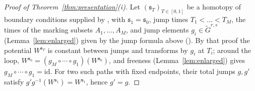\documentclass[11pt]{amsart}
\theoremstyle{definition}
\theoremstyle{remark}
\begin{document}
\begin{proof}[Proof of Theorem~\ref{thm:presentation}(i)]
Let $(\mathfrak s_{T})_{T\in[0,1]}$ be a homotopy of boundary conditions
supplied by \cite[Lem.~3.40]{GKT}, with $\mathfrak s_{1}=\mathfrak s_{0}$, jump times
$T_{1}<\dots<T_{M}$, the times of the marking subsets $A_1,\dots,A_M$, and
jump elements $g_{i}\in\widetilde G^{r,s}$ (Lemma~\ref{lem:enlarged}) given by
the jump formula above
(\cite[proof of Thm.~5.9, eqns.~(5.33)--(5.37)]{GKT}). By that proof the potential
$W^{\mathfrak s_{T}}$ is constant between jumps and transforms by $g_{i}$ at $T_{i}$;
around the loop, $W^{\mathfrak s_{0}}=(g_{M}\circ\cdots\circ g_{1})(W^{\mathfrak s_{0}})$, and
freeness (Lemma~\ref{lem:enlarged}) gives $g_{M}\circ\cdots\circ
g_{1}=\mathrm{id}$. For two such paths with fixed endpoints, their total jumps
$g,g'$ satisfy $g'g^{-1}(W^{\mathfrak s_{1}})=W^{\mathfrak s_{1}}$, hence $g'=g$.
\end{proof}
\end{document}
